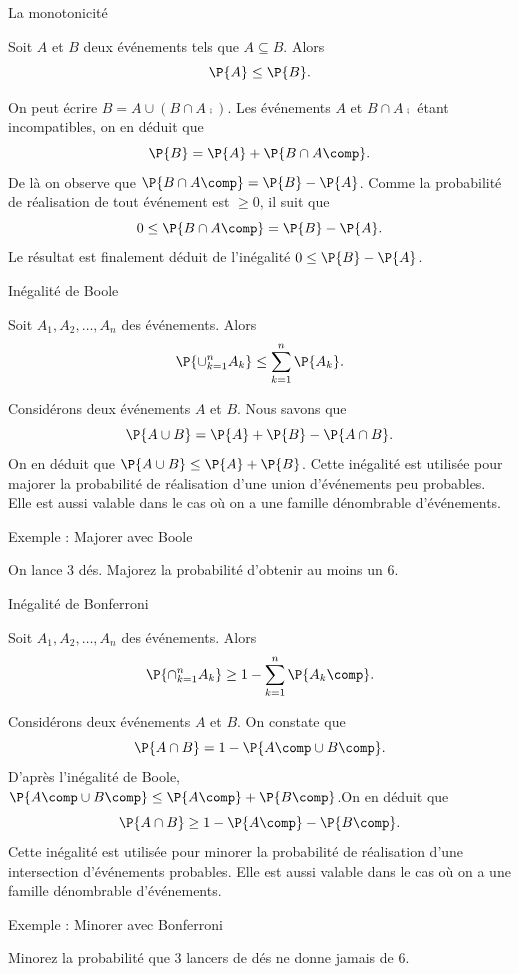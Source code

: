 \documentclass[nuit,charter,pied,handout]{BeamerJS}
\begin{document}
\begin{frame}{La monotonicité}
\pause
	\begin{prop}{}{}
		Soit \(A\) et \(B\) deux événements tels que \(A\subseteq B\). Alors
			\[\P{A}\leq\P{B}.\]
	\end{prop}
	\pause
	On peut écrire \(B=A\cup \left(B\cap A\comp\right)\). Les événements \(A\) et \(B\cap A\comp\) étant incompatibles, on en déduit que
	\[\P{B}=\P{A}+\P{B\cap A\comp}.\]
	De là on observe que \(\P{B\cap A\comp}=\P{B}-\P{A}\). Comme la probabilité de réalisation de tout événement est \(\geq 0\), il suit que
	\[0\leq \P{B\cap A\comp}=\P{B}-\P{A}.\]
	Le résultat est finalement déduit de l'inégalité \(0\leq \P{B}-\P{A}\).
\end{frame}
\begin{frame}{Inégalité de Boole}
\pause
\begin{prop}
 Soit \(A_1,A_2,\ldots, A_n\) des événements. Alors
 \[\P{\cup_{k=1}^n A_k}\leq \sum_{k=1}^n\P{A_k}.\]
\end{prop}
\pause
	Considérons deux événements \(A\) et \(B\). \pause Nous savons que
	\[\P{A\cup B}=\P{A}+\P{B}-\P{A\cap B}.\]
	\pause On en déduit que \(\P{A\cup B}\leq \P{A}+\P{B}\).
Cette inégalité est utilisée pour majorer la probabilité de réalisation d'une union d'événements peu probables. \pause Elle est aussi valable dans le cas où on a une famille dénombrable d'événements.
\end{frame}
\begin{frame}{Exemple : Majorer avec Boole}
	\begin{cadre}
	On lance 3 dés. Majorez la probabilité d'obtenir au moins un 6.
\end{cadre}
\end{frame}
\begin{frame}{Inégalité de Bonferroni}
	\small
\pause
	\begin{prop}
 		Soit \(A_1,A_2,\ldots, A_n\) des événements. Alors
 		\[\P{\cap_{k=1}^n A_k}\geq 1-\sum_{k=1}^n\P{{A_k}\comp}.\]
	\end{prop}
	\pause
	Considérons deux événements \(A\) et \(B\). On constate que
	\[\P{A\cap B}=1-\P{A\comp\cup B\comp}.\]
	\pause
	 D'après l'inégalité de Boole, \(\P{A\comp\cup B\comp}\leq \P{A\comp}+\P{B\comp}\).\pause On en déduit que
	\[\P{A\cap B}\geq 1-\P{A\comp}-\P{B\comp}.\]
	\pause
	Cette inégalité est utilisée pour minorer la probabilité de réalisation d'une intersection d'événements probables. Elle est aussi valable dans le cas où on a une famille dénombrable d'événements.
\end{frame}
\begin{frame}{Exemple : Minorer avec Bonferroni}
	\begin{cadre}
		Minorez la probabilité que 3 lancers de dés ne donne jamais de 6.
	\end{cadre}
\end{frame}
\end{document}
